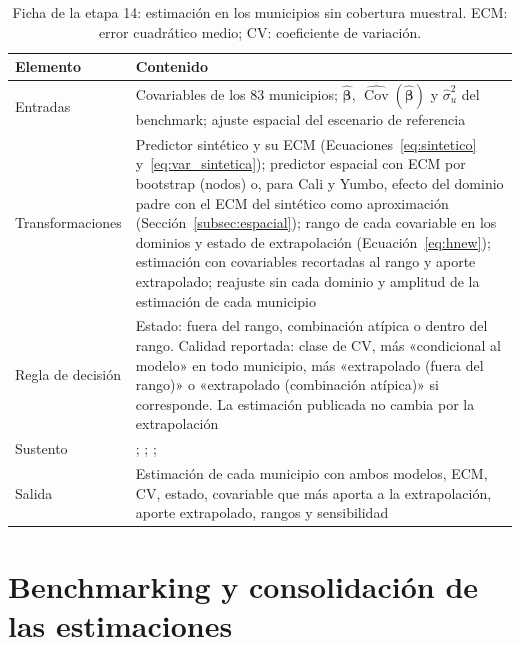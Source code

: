 \begin{table}[!htbp]
\centering
\small
\caption[Ficha de la etapa 14: estimación en los municipios sin cobertura muestral]{Ficha de la etapa 14: estimación en los municipios sin cobertura muestral. ECM: error cuadrático medio; CV: coeficiente de variación.}
\label{tab:met_sin_muestra}
\renewcommand{\arraystretch}{1.15}
\begin{tabularx}{\linewidth}{>{\raggedright\arraybackslash}p{2.8cm} >{\raggedright\arraybackslash}X}
\toprule
Elemento & Contenido \\
\midrule
Entradas & Covariables de los 83 municipios; $\hat{\boldsymbol{\beta}}$, $\widehat{\operatorname{Cov}}(\hat{\boldsymbol{\beta}})$ y $\hat{\sigma}_u^2$ del benchmark; ajuste espacial del escenario de referencia \\
Transformaciones & Predictor sintético y su ECM (Ecuaciones~\ref{eq:sintetico} y~\ref{eq:var_sintetica}); predictor espacial con ECM por bootstrap (nodos) o, para Cali y Yumbo, efecto del dominio padre con el ECM del sintético como aproximación (Sección~\ref{subsec:espacial}); rango de cada covariable en los dominios y estado de extrapolación (Ecuación~\ref{eq:hnew}); estimación con covariables recortadas al rango y aporte extrapolado; reajuste sin cada dominio y amplitud de la estimación de cada municipio \\
Regla de decisión & Estado: fuera del rango, combinación atípica o dentro del rango. Calidad reportada: clase de CV, más «condicional al modelo» en todo municipio, más «extrapolado (fuera del rango)» o «extrapolado (combinación atípica)» si corresponde. La estimación publicada no cambia por la extrapolación \\
Sustento & \cite[pp.~3, 441--442, 453]{morales2021smallarea}; \cite[pp.~38--39]{Molina2019}; \cite[p.~144]{Benedetti2024}; \cite[sec.~3.8]{MontgomeryPeckVining2012} \\
Salida & Estimación de cada municipio con ambos modelos, ECM, CV, estado, covariable que más aporta a la extrapolación, aporte extrapolado, rangos y sensibilidad \\
\bottomrule
\end{tabularx}
\end{table}

\section{Benchmarking y consolidación de las estimaciones}
\label{sec:met_benchmarking}

